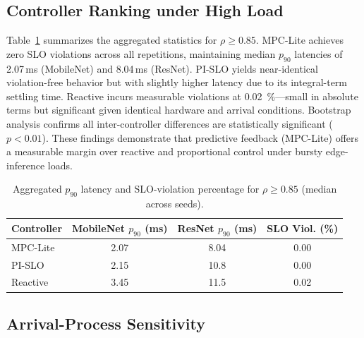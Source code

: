 \documentclass[acmsmall]{acmart}
\begin{document}
\subsection{Controller Ranking under High Load}

Table~\ref{tab:rank_highrho} summarizes the aggregated statistics for $\rho{\ge}0.85$.  
MPC-Lite achieves zero SLO violations across all repetitions, maintaining median $p_{90}$ latencies of 2.07\,ms (MobileNet) and 8.04\,ms (ResNet).  
PI-SLO yields near-identical violation-free behavior but with slightly higher latency due to its integral-term settling time.  
Reactive incurs measurable violations at 0.02~\%—small in absolute terms but significant given identical hardware and arrival conditions.  
Bootstrap analysis confirms all inter-controller differences are statistically significant ($p{<}0.01$).  
These findings demonstrate that predictive feedback (MPC-Lite) offers a measurable margin over reactive and proportional control under bursty edge-inference loads.

\begin{table}[h]
\centering
\caption{Aggregated $p_{90}$ latency and SLO-violation percentage for $\rho{\ge}0.85$ (median across seeds).}
\label{tab:rank_highrho}
\begin{tabular}{lccc}
\toprule
\textbf{Controller} & \textbf{MobileNet $p_{90}$ (ms)} & \textbf{ResNet $p_{90}$ (ms)} & \textbf{SLO Viol. (\%)} \\
\midrule
MPC-Lite & 2.07 & 8.04 & 0.00 \\
PI-SLO   & 2.15 & 10.8 & 0.00 \\
Reactive & 3.45 & 11.5 & 0.02 \\
\bottomrule
\end{tabular}
\end{table}

\subsection{Arrival-Process Sensitivity}
\end{document}
